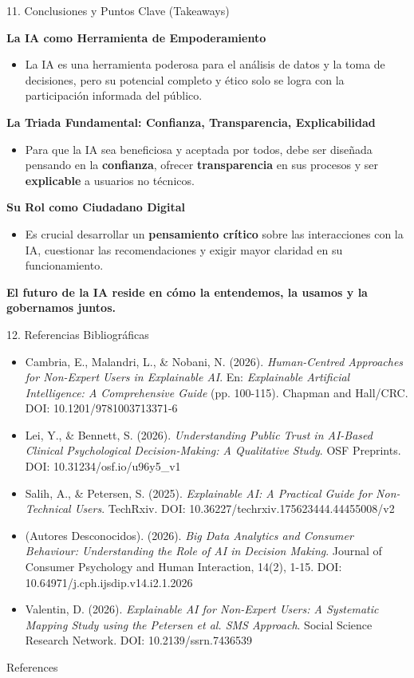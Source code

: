 \documentclass[aspectratio=169]{beamer}
\begin{document}
\begin{frame}[fragile]{11. Conclusiones y Puntos Clave (Takeaways)}


\textbf{La IA como Herramienta de Empoderamiento}
\begin{itemize}
  \item La IA es una herramienta poderosa para el análisis de datos y la toma de decisiones, pero su potencial completo y ético solo se logra con la participación informada del público.
\end{itemize}
\textbf{La Triada Fundamental: Confianza, Transparencia, Explicabilidad}
\begin{itemize}
  \item Para que la IA sea beneficiosa y aceptada por todos, debe ser diseñada pensando en la \textbf{confianza}, ofrecer \textbf{transparencia} en sus procesos y ser \textbf{explicable} a usuarios no técnicos.
\end{itemize}
\textbf{Su Rol como Ciudadano Digital}
\begin{itemize}
  \item Es crucial desarrollar un \textbf{pensamiento crítico} sobre las interacciones con la IA, cuestionar las recomendaciones y exigir mayor claridad en su funcionamiento.
\end{itemize}
\textbf{El futuro de la IA reside en cómo la entendemos, la usamos y la gobernamos juntos.}

\end{frame}



\begin{frame}[fragile]{12. Referencias Bibliográficas}


\begin{itemize}
  \item Cambria, E., Malandri, L., \& Nobani, N. (2026). \textit{Human-Centred Approaches for Non-Expert Users in Explainable AI}. En: \textit{Explainable Artificial Intelligence: A Comprehensive Guide} (pp. 100-115). Chapman and Hall/CRC. DOI: 10.1201/9781003713371-6
  \item Lei, Y., \& Bennett, S. (2026). \textit{Understanding Public Trust in AI-Based Clinical Psychological Decision-Making: A Qualitative Study}. OSF Preprints. DOI: 10.31234/osf.io/u96y5\_v1
  \item Salih, A., \& Petersen, S. (2025). \textit{Explainable AI: A Practical Guide for Non-Technical Users}. TechRxiv. DOI: 10.36227/techrxiv.175623444.44455008/v2
  \item (Autores Desconocidos). (2026). \textit{Big Data Analytics and Consumer Behaviour: Understanding the Role of AI in Decision Making}. Journal of Consumer Psychology and Human Interaction, 14(2), 1-15. DOI: 10.64971/j.cph.ijsdip.v14.i2.1.2026
  \item Valentin, D. (2026). \textit{Explainable AI for Non-Expert Users: A Systematic Mapping Study using the Petersen et al. SMS Approach}. Social Science Research Network. DOI: 10.2139/ssrn.7436539
\end{itemize}
\end{frame}




\begin{frame}[allowframebreaks]{References}
  
  
\end{frame}
\end{document}
